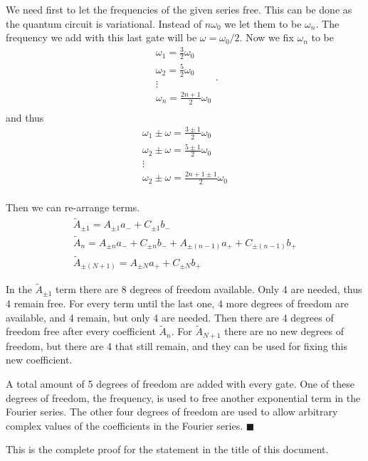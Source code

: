 \documentclass[aps,amssymb,amsmath,amsfonts,pra,superscriptaddress,onecolumn]{revtex4}
\begin{document}
We need first to let the frequencies of the given series free. This can be done as the quantum circuit is variational. Instead of $n\omega_0$ we let them to be $\omega_n$. The frequency we add with this last gate will be $\omega = \omega_0 / 2$. Now we fix $\omega_n$ to be
\begin{equation}
    \begin{matrix}
    \omega_1 = \frac{3}{2}\omega_0 \\
    \omega_2 = \frac{5}{2}\omega_0 \\
    \vdots \\
    \omega_n = \frac{2n + 1}{2}\omega_0 \\
    \end{matrix}.
\end{equation}
and thus
\begin{equation}
    \begin{matrix}
    \omega_1 \pm \omega = \frac{3 \pm 1}{2}\omega_0 \\
    \omega_2 \pm \omega = \frac{5 \pm 1}{2}\omega_0 \\
    \vdots \\
    \omega_2 \pm \omega = \frac{2n + 1 \pm 1}{2}\omega_0 \\
    \end{matrix}
\end{equation}

Then we can re-arrange terms. 
\begin{eqnarray}
    \tilde{A}_{\pm 1} = A_{\pm 1} a_- + C_{\pm 1} b_- \\
    \tilde{A}_n = A_{\pm n} a_- + C_{\pm n} b_- +  A_{\pm (n-1)} a_+ + C_{\pm (n-1)} b_+ \\
    \tilde{A}_{\pm (N + 1)} = A_{\pm N} a_+ + C_{\pm N} b_+
\end{eqnarray}

In the $\tilde{A}_{\pm 1}$ term there are 8 degrees of freedom available. Only 4 are needed, thus 4 remain free. For every term until the last one, 4 more degrees of freedom are available, and 4 remain, but only 4 are needed. Then there are 4 degrees of freedom free after every coefficient $\tilde{A}_n$. For $\tilde{A}_{N + 1}$ there are no new degrees of freedom, but there are 4 that still remain, and they can be used for fixing this new coefficient. 

A total amount of 5 degrees of freedom are added with every gate. One of these degrees of freedom, the frequency, is used to free another exponential term in the Fourier series. The other four degrees of freedom are used to allow arbitrary complex values of the coefficients in the Fourier series.  $\blacksquare$

This is the complete proof for the statement in the title of this document.
\end{document}
